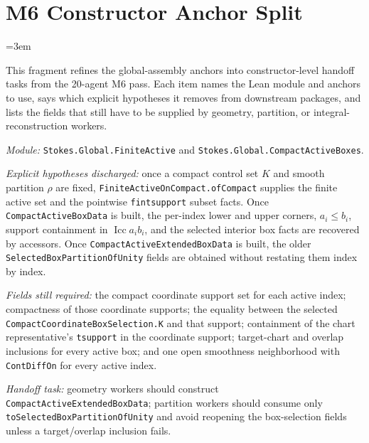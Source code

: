 \section{M6 Constructor Anchor Split}
\label{sec:m6_constructor_anchor_split}
\begingroup
\sloppy
\emergencystretch=3em

This fragment refines the global-assembly anchors into constructor-level
handoff tasks from the 20-agent M6 pass.  Each item names the Lean module and
anchors to use, says which explicit hypotheses it removes from downstream
packages, and lists the fields that still have to be supplied by geometry,
partition, or integral-reconstruction workers.

\begin{definition}
  \label{anc:m6_compact_active_boxes}
  \leanok
  \emph{Module:} \texttt{Stokes.Global.FiniteActive} and
  \texttt{Stokes.Global.CompactActiveBoxes}.

  \emph{Explicit hypotheses discharged:}
  once a compact control set \(K\) and smooth partition \(\rho\) are fixed,
  \texttt{FiniteActiveOnCompact.ofCompact} supplies the finite active set and
  the pointwise \texttt{fintsupport} subset facts.  Once
  \texttt{CompactActiveBoxData} is built, the per-index lower and upper
  corners, \(a_i \le b_i\), support containment in \(\operatorname{Icc} a_i b_i\),
  and the selected interior box facts are recovered by accessors.  Once
  \texttt{CompactActiveExtendedBoxData} is built, the older
  \texttt{SelectedBoxPartitionOfUnity} fields are obtained without restating
  them index by index.

  \emph{Fields still required:}
  the compact coordinate support set for each active index; compactness of
  those coordinate supports; the equality between the selected
  \texttt{CompactCoordinateBoxSelection.K} and that support; containment of the
  chart representative's \texttt{tsupport} in the coordinate support;
  target-chart and overlap inclusions for every active box; and one open
  smoothness neighborhood with \texttt{ContDiffOn} for every active index.

  \emph{Handoff task:}
  geometry workers should construct \texttt{CompactActiveExtendedBoxData};
  partition workers should consume only
  \texttt{toSelectedBoxPartitionOfUnity} and avoid reopening the box-selection
  fields unless a target/overlap inclusion fails.
\end{definition}

